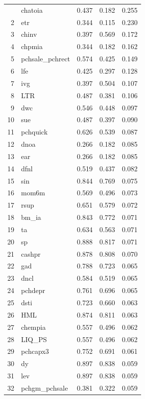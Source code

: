 \begin{footnotesize}
\begin{longtable}{rl|c|c|c}
		\hline\hline
		\endfoot
		1 & chatoia & 0.437 & 0.182 & 0.255 \\ 
		2 & etr & 0.344 & 0.115 & 0.230 \\ 
		3 & chinv & 0.397 & 0.569 & 0.172 \\ 
		4 & chpmia & 0.344 & 0.182 & 0.162 \\ 
		5 & pchsale\_pchrect & 0.574 & 0.425 & 0.149 \\ 
		6 & lfe & 0.425 & 0.297 & 0.128 \\ 
		7 & ivg & 0.397 & 0.504 & 0.107 \\ 
		8 & LTR & 0.487 & 0.381 & 0.106 \\ 
		9 & dwc & 0.546 & 0.448 & 0.097 \\ 
		10 & sue & 0.487 & 0.397 & 0.090 \\ 
		11 & pchquick & 0.626 & 0.539 & 0.087 \\ 
		12 & dnoa & 0.266 & 0.182 & 0.085 \\ 
		13 & ear & 0.266 & 0.182 & 0.085 \\ 
		14 & dfnl & 0.519 & 0.437 & 0.082 \\ 
		15 & sin & 0.844 & 0.769 & 0.075 \\ 
		16 & mom6m & 0.569 & 0.496 & 0.073 \\ 
		17 & rsup & 0.651 & 0.579 & 0.072 \\ 
		18 & bm\_ia & 0.843 & 0.772 & 0.071 \\ 
		19 & ta & 0.634 & 0.563 & 0.071 \\ 
		20 & sp & 0.888 & 0.817 & 0.071 \\ 
		21 & cashpr & 0.878 & 0.808 & 0.070 \\ 
		22 & gad & 0.788 & 0.723 & 0.065 \\ 
		23 & dncl & 0.584 & 0.519 & 0.065 \\ 
		24 & pchdepr & 0.761 & 0.696 & 0.065 \\ 
		25 & dsti & 0.723 & 0.660 & 0.063 \\ 
		26 & HML & 0.874 & 0.811 & 0.063 \\ 
		27 & chempia & 0.557 & 0.496 & 0.062 \\ 
		28 & LIQ\_PS & 0.557 & 0.496 & 0.062 \\ 
		29 & pchcapx3 & 0.752 & 0.691 & 0.061 \\ 
		30 & dy & 0.897 & 0.838 & 0.059 \\ 
		31 & lev & 0.897 & 0.838 & 0.059 \\ 
		32 & pchgm\_pchsale & 0.381 & 0.322 & 0.059 \\ 

\end{longtable}
\end{footnotesize}
